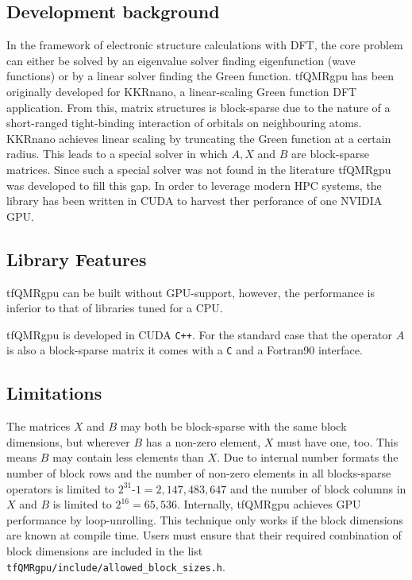 \documentclass[oribibl]{llncs}
\newcommand{\ttt}[1]{\texttt{#1}}
\newcommand{\codename}{tfQMRgpu}
\begin{document}
\subsection{Development background} \label{sec:backstory}
%
In the framework of electronic structure calculations with \ac{DFT},
the core problem can either be solved by an eigenvalue solver finding eigenfunction (wave functions)
or by a linear solver finding the Green function.
\codename{} has been originally developed for KKRnano, a linear-scaling Green function \ac{DFT} application.
From this, matrix structures is block-sparse due to the nature of a short-ranged tight-binding interaction of orbitals on neighbouring atoms.
KKRnano achieves linear scaling by truncating the Green function at a certain radius.
This leads to a special solver in which $A, X$ and $B$ are block-sparse matrices.
Since such a special solver was not found in the literature \codename{} was developed to fill this gap.
In order to leverage modern \ac{HPC} systems, the library has been written in CUDA
to harvest ther perforance of one NVIDIA \ac{GPU}.

\subsection{Library Features} \label{sec:features}
%
\codename{} can be built without \ac{GPU}-support, however,
the performance is inferior to that of libraries tuned for a \ac{CPU}.

\noindent
\codename{} is developed in CUDA \ttt{C++}.
For the standard case that the operator $A$ is also a block-sparse matrix
it comes with a \ttt{C} and a Fortran90 interface.

\subsection{Limitations}
%
The matrices $X$ and $B$ may both be block-sparse with the same block dimensions, but
wherever $B$ has a non-zero element, $X$ must have one, too.
This means $B$ may contain less elements than $X$.
Due to internal number formats the number of block rows 
and the number of non-zero elements in all blocks-sparse operators 
is limited to $2^{31}$-$1 = 2,147,483,647$ 
and the number of block columns in $X$ and $B$ 
is limited to $2^{16} = 65,536$.
Internally, \codename{} achieves \ac{GPU} performance by loop-unrolling.
This technique only works if the block dimensions are known at compile time.
Users must ensure that their required combination of block dimensions are included in the list
\ttt{tfQMRgpu/include/allowed\_block\_sizes.h}.
\end{document}
